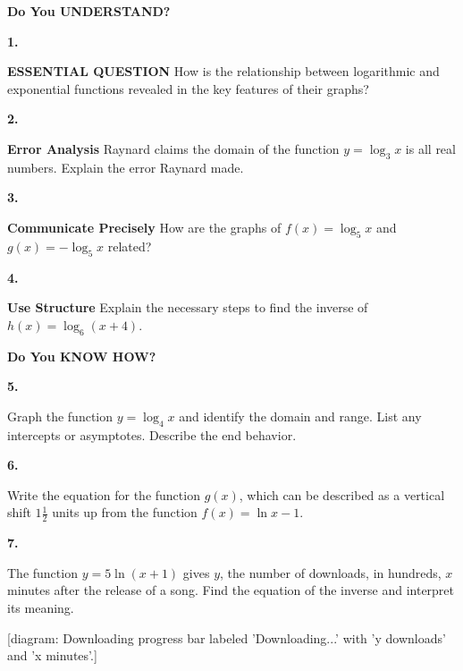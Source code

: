 \documentclass{article}
\newenvironment{practice}[2]{\textbf{#1.}\par}{\par}
\newcommand{\answer}[1]{}
\newcommand{\placeholder}[2]{[#1: #2]}
\begin{document}
\vspace{1em}
\textbf{Do You UNDERSTAND?}

\begin{practice}{1}{}
\textbf{ESSENTIAL QUESTION} How is the relationship between logarithmic and exponential functions revealed in the key features of their graphs?
\answer{}
\end{practice}

\begin{practice}{2}{}
\textbf{Error Analysis} Raynard claims the domain of the function $y = \log_3 x$ is all real numbers. Explain the error Raynard made.
\answer{}
\end{practice}

\begin{practice}{3}{}
\textbf{Communicate Precisely} How are the graphs of $f(x) = \log_5 x$ and $g(x) = -\log_5 x$ related?
\answer{}
\end{practice}

\begin{practice}{4}{}
\textbf{Use Structure} Explain the necessary steps to find the inverse of $h(x) = \log_6(x + 4)$.
\answer{}
\end{practice}

\vspace{1em}
\textbf{Do You KNOW HOW?}

\begin{practice}{5}{}
Graph the function $y = \log_4 x$ and identify the domain and range. List any intercepts or asymptotes. Describe the end behavior.
\answer{}
\end{practice}

\begin{practice}{6}{}
Write the equation for the function $g(x)$, which can be described as a vertical shift $1\frac{1}{2}$ units up from the function $f(x) = \ln x - 1$.
\answer{}
\end{practice}

\begin{practice}{7}{}
The function $y = 5 \ln(x + 1)$ gives $y$, the number of downloads, in hundreds, $x$ minutes after the release of a song. Find the equation of the inverse and interpret its meaning.

\placeholder{diagram}{Downloading progress bar labeled 'Downloading...' with 'y downloads' and 'x minutes'.}
\answer{}
\end{practice}
\end{document}
